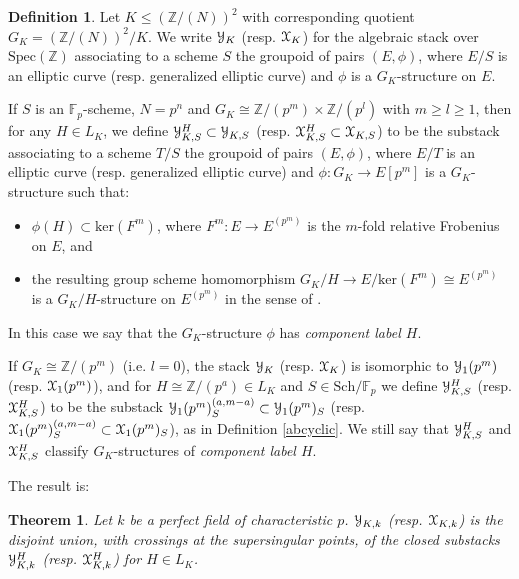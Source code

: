 \documentclass[11pt]{amsart}
\newtheorem{theorem}[subsection]{Theorem}
\theoremstyle{definition}
\newtheorem{definition}[subsection]{Definition}
\begin{document}
\begin{definition}\label{gkstructures}
Let $K \leq (\mathbb{Z}/(N))^2$ with corresponding quotient $G_K = (\mathbb{Z}/(N))^2/K$. We write ${\mathbf{\EuScript{Y}}}_K$ (resp. ${\mathbf{\EuScript{X}}}_K$) for the algebraic stack over $\mathrm{Spec}(\mathbb{Z})$ associating to a scheme $S$ the groupoid of pairs $(E,\phi)$, where $E/S$ is an elliptic curve (resp. generalized elliptic curve) and $\phi$ is a $G_K$-structure on $E$. 

If $S$ is an $\mathbb{F}_p$-scheme, $N = p^n$ and $G_K \cong \mathbb{Z}/(p^m) \times \mathbb{Z}/(p^l)$ with $m \geq l \geq 1$, then for any $H \in L_K$, we define ${\mathbf{\EuScript{Y}}}^H_{K,S} \subset {\mathbf{\EuScript{Y}}}_{K,S}$ (resp. ${\mathbf{\EuScript{X}}}^H_{K,S} \subset {\mathbf{\EuScript{X}}}_{K,S}$) to be the substack associating to a scheme $T/S$ the groupoid of pairs $(E,\phi)$, where $E/T$ is an elliptic curve (resp. generalized elliptic curve) and $\phi: G_K \rightarrow E[p^m]$ is a $G_K$-structure such that:
\begin{itemize}
  \item $\phi(H) \subset \mathrm{ker}(F^m)$, where $F^m: E \rightarrow E^{(p^m)}$ is the $m$-fold relative Frobenius on $E$, and 
  \item the resulting group scheme homomorphism $G_K/H \rightarrow E/\mathrm{ker}(F^m) \cong E^{(p^m)}$ is a $G_K/H$-structure on $E^{(p^m)}$ in the sense of \cite[\S1.5]{KM1}.
\end{itemize}
In this case we say that the $G_K$-structure $\phi$ has \textit{component label $H$}.

If $G_K \cong \mathbb{Z}/(p^m)$ (i.e. $l = 0$), the stack ${\mathbf{\EuScript{Y}}}_K$ (resp. ${\mathbf{\EuScript{X}}}_K$) is isomorphic to ${\mathbf{\EuScript{Y}}}_1(p^m)$ (resp. ${\mathbf{\EuScript{X}}}_1(p^m)$), and for $H \cong \mathbb{Z}/(p^a) \in L_K$ and $S \in \mathrm{Sch}/\mathbb{F}_p$ we define ${\mathbf{\EuScript{Y}}}^H_{K,S}$ (resp. ${\mathbf{\EuScript{X}}}^H_{K,S}$) to be the substack ${\mathbf{\EuScript{Y}}}_1(p^m)^{(a,m-a)}_S \subset {\mathbf{\EuScript{Y}}}_1(p^m)_S$ (resp. ${\mathbf{\EuScript{X}}}_1(p^m)^{(a,m-a)}_S \subset {\mathbf{\EuScript{X}}}_1(p^m)_S$), as in Definition \ref{abcyclic}. We still say that ${\mathbf{\EuScript{Y}}}^H_{K,S}$ and ${\mathbf{\EuScript{X}}}^H_{K,S}$ classify $G_K$-structures of \textit{component label $H$}.
\end{definition}
The result is:

\begin{theorem}\label{gkstructurescharp}
Let $k$ be a perfect field of characteristic $p$. ${\mathbf{\EuScript{Y}}}_{K,k}$ (resp. ${\mathbf{\EuScript{X}}}_{K,k}$) is the disjoint union, with crossings at the supersingular points, of the closed substacks ${\mathbf{\EuScript{Y}}}_{K,k}^H$ (resp. ${\mathbf{\EuScript{X}}}_{K,k}^H$) for $H \in L_K$.
\end{theorem}
\end{document}

